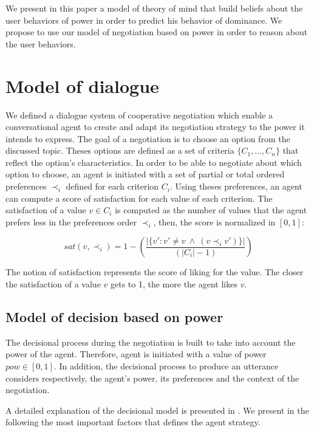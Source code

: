 \documentclass[sigconf]{aamas}  %
\begin{document}
	We present in this paper a model of theory of mind that build beliefs about the user behaviors of power in order to predict his behavior of dominance. We propose to use our model of negotiation based on power in order to reason about the user behaviors. 
	\section{Model of dialogue}
	
	We defined a dialogue system of cooperative negotiation which enable  a conversational agent to create and adapt its negotiation strategy to the power it intends to express. The goal of a negotiation is to choose an option from the discussed topic. Theses options are defined as a set of criteria  $\{C_1, ..., C_n\}$ that reflect the option's characteristics. In order to be able to negotiate about which option to choose, an agent is initiated with a set of partial or total ordered preferences $\prec_i$ defined for each criterion $C_i$. Using theses preferences, an agent can compute a score of satisfaction for each value of each criterion. The satisfaction of a value $v \in C_i$ is computed as the number of values that the agent prefers less in the preferences order $\prec_i$, then, the score is normalized in $[0, 1]$: 
	
	\begin{equation}
	sat(v, \prec_i) =	1 - \left( \frac{|\{v' : v' \neq v \  \wedge \ (v \prec_i v')\}| }{( |C_i| - 1 )}\right)
	\end{equation}
	
	The notion of satisfaction represents the score of liking for the value. The closer the satisfaction of a value $v$ gets to 1, the more the agent likes $v$. 
	
	\subsection{Model of decision based on power}
	The decisional process during the negotiation is built to take into account the power of the agent. Therefore, agent is initiated with a value of power $pow \in [0,1]$. In addition, the decisional process to produce an utterance considers respectively, the agent's power, its preferences and the context of the negotiation.  
	
	A detailed explanation of the decisional model is presented in \cite{} . We present in the following the most important factors that defines the agent strategy.
	
\end{document}
